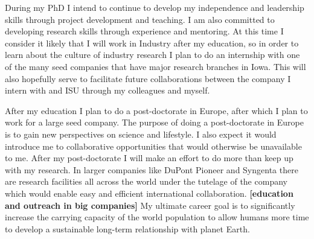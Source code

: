\documentclass[12pt]{amsart}
\begin{document}
During my PhD I intend to continue to develop my independence and leadership skills through project development and teaching.  
I am also committed to developing research skills through experience and mentoring.  
At this time I consider it likely that I will work in Industry after my education, so in order to learn about the culture of industry research I plan to do an internship with one of the many seed companies that have major research branches in Iowa.
This will also hopefully serve to facilitate future collaborations between the company I intern with and ISU through my colleagues and myself.

After my education I plan to do a post-doctorate in Europe, after which I plan to work for a large seed company.
The purpose of doing a post-doctorate in Europe is to gain new perspectives on science and lifestyle.
I also expect it would introduce me to collaborative opportunities that would otherwise be unavailable to me.
After my post-doctorate I will make an effort to do more than keep up with my research.
In larger companies like DuPont Pioneer and Syngenta there are research facilities all across the world under the tutelage of the company which would enable easy and efficient international collaboration. \textbf{[education and outreach in big companies]}
My ultimate career goal is to significantly increase the carrying capacity of the world population to allow humans more time to develop a sustainable long-term relationship with planet Earth.
\end{document}
